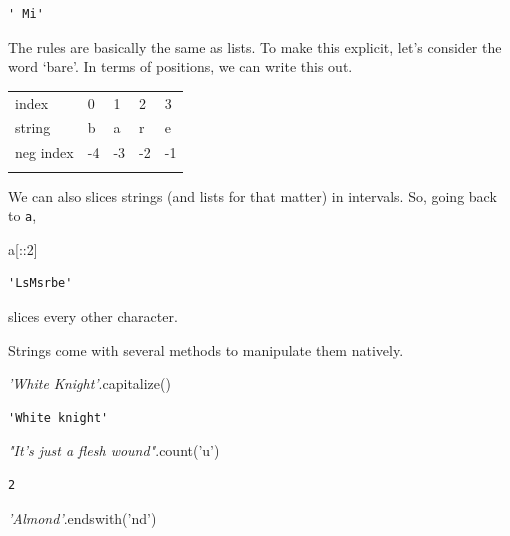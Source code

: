\documentclass[
  letterpaper,
]{scrbook}
\newenvironment{Shaded}{\begin{snugshade}}{\end{snugshade}}
\newcommand{\CommentTok}[1]{\textcolor[rgb]{0.56,0.35,0.01}{\textit{#1}}}
\newcommand{\DecValTok}[1]{\textcolor[rgb]{0.00,0.00,0.81}{#1}}
\newcommand{\NormalTok}[1]{#1}
\newcommand{\StringTok}[1]{\textcolor[rgb]{0.31,0.60,0.02}{#1}}
\begin{document}
\begin{verbatim}
' Mi'
\end{verbatim}

The rules are basically the same as lists. To make this explicit, let's consider the word `bare'.
In terms of positions, we can write this out.

\begin{longtable}[]{@{}lllll@{}}
\toprule
\endhead
index & 0 & 1 & 2 & 3\tabularnewline
string & b & a & r & e\tabularnewline
neg index & -4 & -3 & -2 & -1\tabularnewline
& & & &\tabularnewline
\bottomrule
\end{longtable}

We can also slices strings (and lists for that matter) in intervals. So, going back to \texttt{a},

\begin{Shaded}
\begin{Highlighting}[]
\NormalTok{a[::}\DecValTok{2}\NormalTok{]}
\end{Highlighting}
\end{Shaded}

\begin{verbatim}
'LsMsrbe'
\end{verbatim}

slices every other character.

Strings come with several methods to manipulate them natively.

\begin{Shaded}
\begin{Highlighting}[]
\CommentTok{'White Knight'}\NormalTok{.capitalize()}
\end{Highlighting}
\end{Shaded}

\begin{verbatim}
'White knight'
\end{verbatim}

\begin{Shaded}
\begin{Highlighting}[]
\CommentTok{"It's just a flesh wound"}\NormalTok{.count(}\StringTok{'u'}\NormalTok{)}
\end{Highlighting}
\end{Shaded}

\begin{verbatim}
2
\end{verbatim}

\begin{Shaded}
\begin{Highlighting}[]
\CommentTok{'Almond'}\NormalTok{.endswith(}\StringTok{'nd'}\NormalTok{)}
\end{Highlighting}
\end{Shaded}
\end{document}
